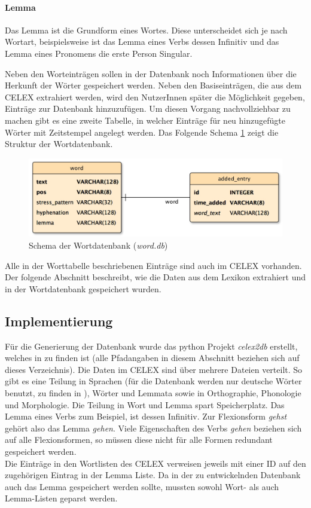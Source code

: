 \paragraph{Lemma}
Das Lemma ist die Grundform eines Wortes. Diese unterscheidet sich je nach Wortart, beispielsweise ist das Lemma eines Verbs dessen Infinitiv und das Lemma eines Pronomens die erste Person Singular.


Neben den Worteinträgen sollen in der Datenbank noch Informationen über die Herkunft der Wörter gespeichert werden. Neben den Basiseinträgen, die aus dem CELEX extrahiert werden, wird den NutzerInnen später die Möglichkeit gegeben, Einträge zur Datenbank hinzuzufügen. Um diesen Vorgang nachvollziehbar zu machen gibt es eine zweite Tabelle, in welcher Einträge für neu hinzugefügte Wörter mit Zeitstempel angelegt werden. Das Folgende Schema \ref{fig:worddatabase} zeigt die Struktur der Wortdatenbank.

\begin{figure}[h!]
	\centering
	\includegraphics[width=.6\linewidth]{figures/worddb}
	\caption{Schema der Wortdatenbank (\textit{word.db})}
	\label{fig:worddatabase}
\end{figure}

Alle in der Worttabelle beschriebenen Einträge sind auch im CELEX vorhanden. Der folgende Abschnitt beschreibt, wie die Daten aus dem Lexikon extrahiert und in der Wortdatenbank gespeichert wurden.

\subsection{Implementierung}

Für die Generierung der Datenbank wurde das python Projekt \textit{celex2db} erstellt, welches in  zu finden ist (alle Pfadangaben in diesem Abschnitt beziehen sich auf dieses Verzeichnis). Die Daten im CELEX sind über mehrere Dateien verteilt. So gibt es eine Teilung in Sprachen (für die Datenbank werden nur deutsche Wörter benutzt, zu finden in ), Wörter und Lemmata sowie in Orthographie, Phonologie und Morphologie. Die Teilung in Wort und Lemma spart Speicherplatz. Das Lemma eines Verbs zum Beispiel, ist dessen Infinitiv. Zur Flexionsform \textit{gehst} gehört also das Lemma \textit{gehen}. Viele Eigenschaften des Verbs \textit{gehen} beziehen sich auf alle Flexionsformen, so müssen diese nicht für alle Formen redundant gespeichert werden.\\
Die Einträge in den Wortlisten des CELEX verweisen jeweils mit einer ID auf den zugehörigen Eintrag in der Lemma Liste. Da in der zu entwickelnden Datenbank auch das Lemma gespeichert werden sollte, mussten sowohl Wort- als auch Lemma-Listen geparst werden.

